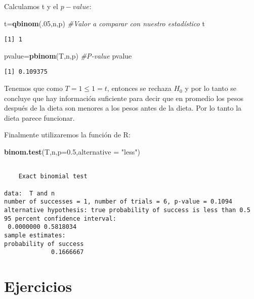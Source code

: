 \documentclass[
  a4paper,
  oneside,
  openany]{book}
\newenvironment{Shaded}{\begin{snugshade}}{\end{snugshade}}
\newcommand{\AttributeTok}[1]{\textcolor[rgb]{0.13,0.29,0.53}{#1}}
\newcommand{\CommentTok}[1]{\textcolor[rgb]{0.56,0.35,0.01}{\textit{#1}}}
\newcommand{\DecValTok}[1]{\textcolor[rgb]{0.00,0.00,0.81}{#1}}
\newcommand{\FloatTok}[1]{\textcolor[rgb]{0.00,0.00,0.81}{#1}}
\newcommand{\FunctionTok}[1]{\textcolor[rgb]{0.13,0.29,0.53}{\textbf{#1}}}
\newcommand{\NormalTok}[1]{#1}
\newcommand{\OtherTok}[1]{\textcolor[rgb]{0.56,0.35,0.01}{#1}}
\newcommand{\StringTok}[1]{\textcolor[rgb]{0.31,0.60,0.02}{#1}}
\begin{document}
Calculamos t y el \(p-value\):

\begin{Shaded}
\begin{Highlighting}[]
\NormalTok{t}\OtherTok{=}\FunctionTok{qbinom}\NormalTok{(.}\DecValTok{05}\NormalTok{,n,p)         }\CommentTok{\#Valor a comparar con nuestro estadístico}
\NormalTok{t}
\end{Highlighting}
\end{Shaded}

\begin{verbatim}
[1] 1
\end{verbatim}

\begin{Shaded}
\begin{Highlighting}[]
\NormalTok{pvalue}\OtherTok{=}\FunctionTok{pbinom}\NormalTok{(T,n,p)       }\CommentTok{\#P{-}value}
\NormalTok{pvalue}
\end{Highlighting}
\end{Shaded}

\begin{verbatim}
[1] 0.109375
\end{verbatim}

Tenemos que como \(T=1\leq 1 =t\), entonces se rechaza \(H_0\) y por lo tanto se concluye que hay información suficiente para decir que en promedio los pesos después de la dieta son menores a los pesos antes de la dieta. Por lo tanto la dieta parece funcionar.

Finalmente utilizaremos la función de R:

\begin{Shaded}
\begin{Highlighting}[]
\FunctionTok{binom.test}\NormalTok{(T,n,}\AttributeTok{p=}\FloatTok{0.5}\NormalTok{,}\AttributeTok{alternative =} \StringTok{"less"}\NormalTok{)}
\end{Highlighting}
\end{Shaded}

\begin{verbatim}

    Exact binomial test

data:  T and n
number of successes = 1, number of trials = 6, p-value = 0.1094
alternative hypothesis: true probability of success is less than 0.5
95 percent confidence interval:
 0.0000000 0.5818034
sample estimates:
probability of success 
             0.1666667 
\end{verbatim}

\hypertarget{ejercicios-2}{%
\section{Ejercicios}\label{ejercicios-2}}
\end{document}
